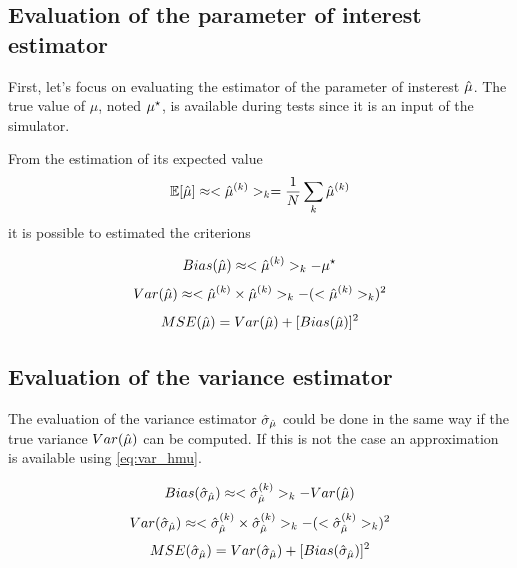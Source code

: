 \subsection{Evaluation of the parameter of interest estimator} %
\label{sub:evaluation_of_the_parameter_of_interest_estimator}

First, let's focus on evaluating the estimator of the parameter of insterest $\hat\mu$.
The true value of $\mu$, noted $\mu^\star$, is available during tests since it is an input of the simulator.

From the estimation of its expected value
\begin{equation}
  \mathbb{E}[\hat\mu] \approx <\hat\mu^{(k)}>_k = \frac{1}{N} \sum_{k} \hat\mu^{(k)}
\end{equation}
it is possible to estimated the criterions

\begin{equation}
  Bias(\hat\mu) \approx <\hat\mu^{(k)}>_k - \mu^\star
\end{equation}
\begin{equation}
  \label{eq:var_hmu}
  Var(\hat\mu) \approx <\hat\mu^{(k)} \times \hat\mu^{(k)}>_k - (<\hat\mu^{(k)}>_k)^2
\end{equation}
\begin{equation}
  MSE(\hat\mu) = Var(\hat\mu) + [Bias(\hat\mu)]^2
\end{equation}




\subsection{Evaluation of the variance estimator} %
\label{sub:evaluation_of_the_variance_estimator}

The evaluation of the variance estimator $\hat\sigma_{\hat\mu}$ could be done in the same way if the true variance $Var(\hat\mu)$ can be computed.
If this is not the case an approximation is available using \autoref{eq:var_hmu}.

\begin{equation}
  Bias(\hat\sigma_{\hat\mu}) \approx <\hat\sigma_{\hat\mu}^{(k)}>_k - Var(\hat\mu)
\end{equation}
\begin{equation}
  Var(\hat\sigma_{\hat\mu}) \approx <\hat\sigma_{\hat\mu}^{(k)} \times \hat\sigma_{\hat\mu}^{(k)}>_k - (<\hat\sigma_{\hat\mu}^{(k)}>_k)^2
\end{equation}
\begin{equation}
  MSE(\hat\sigma_{\hat\mu}) = Var(\hat\sigma_{\hat\mu}) + [Bias(\hat\sigma_{\hat\mu})]^2
\end{equation}


